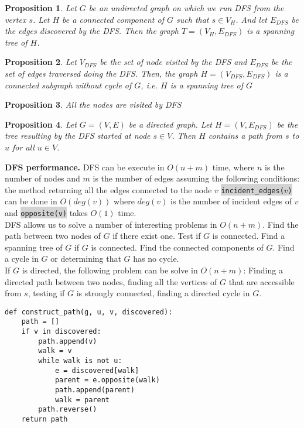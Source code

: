 \documentclass[10pt]{article}
\newtheorem{prop}{Proposition}
\newcommand{\code}[1]{{\small\colorbox{LightGray}{\texttt{#1}}}}
\begin{document}
\begin{prop}
	Let $G$ be an undirected graph on which we run DFS from the vertex $s$. Let $H$ be a connected component of $G$ such that $s\in V_H$. And let $E_{DFS}$ be the edges discovered by the DFS. Then the graph $T=(V_H, E_{DFS})$ is a spanning tree of $H$. 
\end{prop}

\begin{prop}
	Let $V_{DFS}$ be the set of node visited by the DFS and $E_{DFS}$ be the set of edges traversed doing the DFS. Then, the graph $H=(V_{DFS}, E_{DFS})$ is a connected subgraph without cycle of $G$, i.e. $H$ is a spanning tree of $G$
\end{prop}

\begin{prop}
	All the nodes are visited by DFS
\end{prop}

\begin{prop}
	Let $G=(V, E)$ be a directed graph. Let $H=(V, E_{DFS})$ be the tree resulting by the DFS started at node $s\in V$. Then $H$ contains a path from $s$ to $u$ for all $u\in V$. 
\end{prop}

\textbf{DFS performance.} DFS can be execute in $O(n+m)$ time, where $n$ is the number of nodes and $m$ is the number of edges assuming the following conditions: the method returning all the edges connected to the node $v$ \code{incident\_edges($v$)} can be done in $O(deg(v))$ where $deg(v)$ is the number of incident edges of $v$ and \code{opposite(v)} takes $O(1)$ time.\\

DFS allows us to solve a number of interesting problems in $O(n+m)$. Find the path between two nodes of $G$ if there exist one. Test if $G$ is connected. Find a spanning tree of $G$ if $G$ is connected. Find the connected components of $G$. Find a cycle in $G$ or determining that $G$ has no cycle. \\

If $G$ is directed, the following problem can be solve in $O(n+m)$: Finding a directed path between two nodes, finding all the vertices of $G$ that are accessible from $s$, testing if $G$ is strongly connected, finding a directed cycle in $G$.

\begin{verbatim}
def construct_path(g, u, v, discovered):
    path = []
    if v in discovered:
        path.append(v)
        walk = v
        while walk is not u:
            e = discovered[walk]
            parent = e.opposite(walk)
            path.append(parent)
            walk = parent
        path.reverse()
    return path
\end{verbatim}
\end{document}
